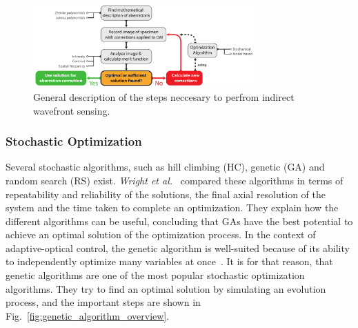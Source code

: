 \begin{figure}[htb]
	\centering
		\includegraphics[width=0.75\textwidth]{images/indirect_wavefront_sensing}
	\caption{General description of the steps neccesary to perfrom indirect wavefront sensing. }
	\label{fig:indirect_wavefront_sensing}
\end{figure}


\subsubsection{Stochastic Optimization}
\label{sec:GeneticAndRandomOptimizationMethods}

Several stochastic algorithms, such as hill climbing (HC), genetic (GA) and random search (RS) exist. \emph{Wright et al.}~\cite{Genetic_compared_to_others} compared these algorithms in terms of repeatability and reliability of the solutions, the final axial resolution of the system and the time taken to complete an optimization. They explain how the different algorithms can be useful, concluding that GAs have the best potential to achieve an optimal solution of the optimization process. In the context of adaptive-optical control, the genetic algorithm is well-suited because of its ability to independently optimize many variables at once~\cite{Genetic_closed_loop}. It is for that reason, that genetic algorithms are one of the most popular stochastic optimization algorithms. They try to find an optimal solution by simulating an evolution process, and the important steps are shown in Fig.~\ref{fig:genetic_algorithm_overview}. 


